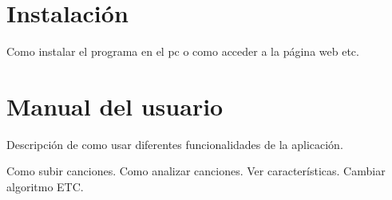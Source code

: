 \section{Instalación}

Como instalar el programa en el pc o como acceder a la página web etc.

\section{Manual del usuario}
Descripción de como usar diferentes funcionalidades de la aplicación.

Como subir canciones.
Como analizar canciones.
Ver características.
Cambiar algoritmo
ETC.